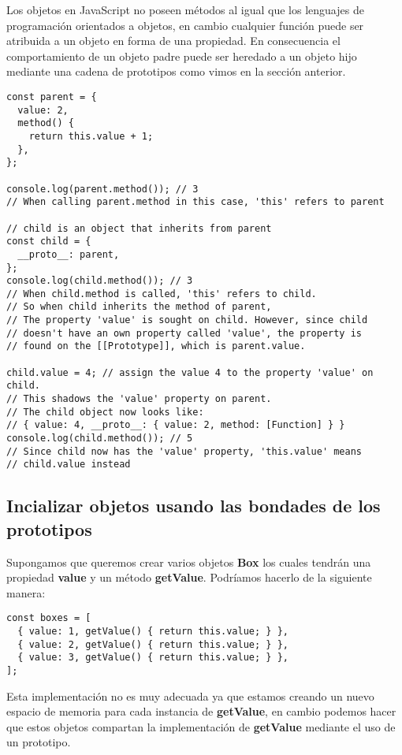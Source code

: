 \documentclass{article}
\begin{document}
Los objetos en JavaScript no poseen métodos al igual que los lenguajes de programación orientados  a objetos,
en cambio cualquier función puede ser atribuida a un objeto en forma de una propiedad. En consecuencia el
comportamiento de un objeto padre puede ser heredado a un objeto hijo mediante una cadena de prototipos como vimos
en la sección anterior.

\begin{lstlisting}
const parent = {
  value: 2,
  method() {
    return this.value + 1;
  },
};

console.log(parent.method()); // 3
// When calling parent.method in this case, 'this' refers to parent

// child is an object that inherits from parent
const child = {
  __proto__: parent,
};
console.log(child.method()); // 3
// When child.method is called, 'this' refers to child.
// So when child inherits the method of parent,
// The property 'value' is sought on child. However, since child
// doesn't have an own property called 'value', the property is
// found on the [[Prototype]], which is parent.value.

child.value = 4; // assign the value 4 to the property 'value' on child.
// This shadows the 'value' property on parent.
// The child object now looks like:
// { value: 4, __proto__: { value: 2, method: [Function] } }
console.log(child.method()); // 5
// Since child now has the 'value' property, 'this.value' means
// child.value instead

\end{lstlisting}

\subsection{Incializar objetos usando las bondades de los prototipos}

Supongamos que queremos crear varios objetos \textbf{Box} los cuales tendrán una propiedad \textbf{value} y un método
\textbf{getValue}. Podríamos hacerlo de la siguiente manera:

\begin{lstlisting}
const boxes = [
  { value: 1, getValue() { return this.value; } },
  { value: 2, getValue() { return this.value; } },
  { value: 3, getValue() { return this.value; } },
];
\end{lstlisting}

Esta implementación no es muy adecuada ya que estamos creando un nuevo espacio de memoria para cada instancia
de \textbf{getValue}, en cambio podemos hacer que estos objetos compartan la implementación de \textbf{getValue}
mediante el uso de un prototipo.
\end{document}
